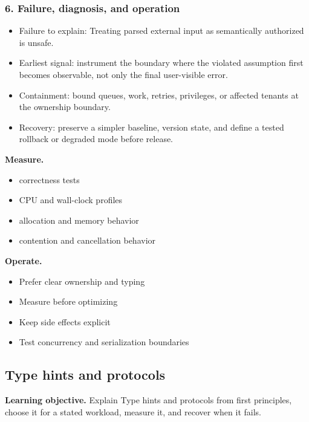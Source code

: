\subsubsection*{6. Failure, diagnosis, and operation}
\begin{itemize}
\item Failure to explain: Treating parsed external input as semantically authorized is unsafe.
\item Earliest signal: instrument the boundary where the violated assumption first becomes observable, not only the final user-visible error.
\item Containment: bound queues, work, retries, privileges, or affected tenants at the ownership boundary.
\item Recovery: preserve a simpler baseline, version state, and define a tested rollback or degraded mode before release.
\end{itemize}
\textbf{Measure.}\begin{itemize}
\item correctness tests
\item CPU and wall-clock profiles
\item allocation and memory behavior
\item contention and cancellation behavior
\end{itemize}
\textbf{Operate.}\begin{itemize}
\item Prefer clear ownership and typing
\item Measure before optimizing
\item Keep side effects explicit
\item Test concurrency and serialization boundaries
\end{itemize}
\subsection{Type hints and protocols}
\textbf{Learning objective.} Explain Type hints and protocols from first principles, choose it for a stated workload, measure it, and recover when it fails.
